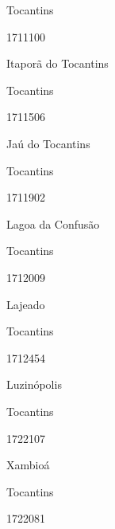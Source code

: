\documentclass[
  letterpaper,
]{report}
\begin{document}
Tocantins

\n      

1711100

\n      

Itaporã do Tocantins

\n    

\n    

\n      

Tocantins

\n      

1711506

\n      

Jaú do Tocantins

\n    

\n    

\n      

Tocantins

\n      

1711902

\n      

Lagoa da Confusão

\n    

\n    

\n      

Tocantins

\n      

1712009

\n      

Lajeado

\n    

\n    

\n      

Tocantins

\n      

1712454

\n      

Luzinópolis

\n    

\n    

\n      

Tocantins

\n      

1722107

\n      

Xambioá

\n    

\n    

\n      

Tocantins

\n      

1722081

\n      
\end{document}
